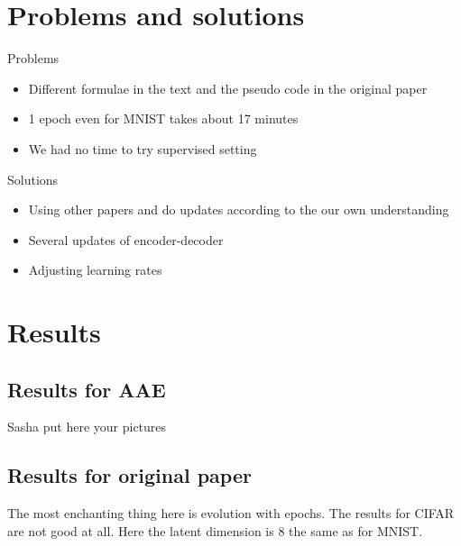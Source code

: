 \documentclass{article}
\begin{document}
    \section{Problems and solutions}

    Problems
    \begin{itemize}
        \item Different formulae in the text and the pseudo code in the original paper
        \item 1 epoch even for MNIST takes about 17 minutes
        \item We had no time to try supervised setting
    \end{itemize}
    Solutions
    \begin{itemize}
        \item Using other papers and do updates according to the our own understanding
        \item Several updates of encoder-decoder
        \item Adjusting learning rates
    \end{itemize}


    \section{Results}

    \subsection{Results for AAE}
    Sasha put here your pictures

    \subsection{Results for original paper}

    The most enchanting thing here is evolution with epochs.
    The results for CIFAR are not good at all. Here the latent dimension is 8 the same as for MNIST.
\end{document}
